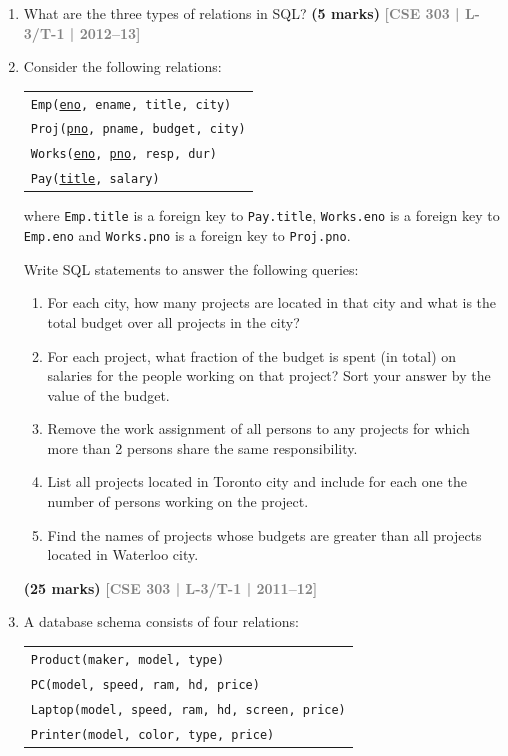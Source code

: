 \documentclass[12pt,a3paper]{article}
\newcommand{\yr}[1]{\hfill\textcolor{gray}{\small\textbf{[#1]}}}
\newcommand{\mk}[1]{\textcolor{orange!70!black}{\small\textbf{(#1 marks)}}}
\begin{document}
\begin{enumerate}
\item What are the three types of relations in SQL?
\mk{5} \yr{CSE 303 | L-3/T-1 | 2012--13}

\item Consider the following relations:
\begin{center}
\begin{tabular}{l}
\texttt{Emp(\underline{eno}, ename, title, city)}\\
\texttt{Proj(\underline{pno}, pname, budget, city)}\\
\texttt{Works(\underline{eno}, \underline{pno}, resp, dur)}\\
\texttt{Pay(\underline{title}, salary)}
\end{tabular}
\end{center}
where \texttt{Emp.title} is a foreign key to \texttt{Pay.title}, \texttt{Works.eno} is a foreign key to \texttt{Emp.eno} and \texttt{Works.pno} is a foreign key to \texttt{Proj.pno}.

Write SQL statements to answer the following queries:
\begin{enumerate}
  \item For each city, how many projects are located in that city and what is the total budget over all projects in the city?
  \item For each project, what fraction of the budget is spent (in total) on salaries for the people working on that project? Sort your answer by the value of the budget.
  \item Remove the work assignment of all persons to any projects for which more than 2 persons share the same responsibility.
  \item List all projects located in Toronto city and include for each one the number of persons working on the project.
  \item Find the names of projects whose budgets are greater than all projects located in Waterloo city.
\end{enumerate}
\mk{25} \yr{CSE 303 | L-3/T-1 | 2011--12}

\item A database schema consists of four relations:
\begin{center}
\begin{tabular}{l}
\texttt{Product(maker, model, type)}\\
\texttt{PC(model, speed, ram, hd, price)}\\
\texttt{Laptop(model, speed, ram, hd, screen, price)}\\
\texttt{Printer(model, color, type, price)}
\end{tabular}
\end{center}


\end{enumerate}
\end{document}
